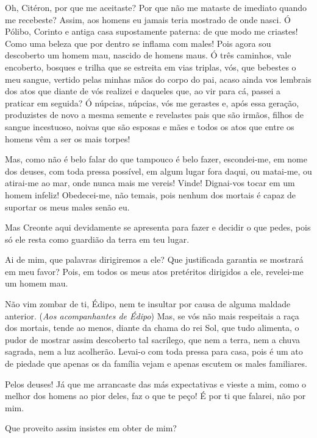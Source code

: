 Oh, Citéron, por que me aceitaste? Por que não me mataste de imediato
quando me recebeste? Assim, aos homens eu jamais teria mostrado de onde
nasci. Ó Pólibo, Corinto e antiga casa supostamente paterna: de que modo
me criastes! Como uma beleza que por dentro se inflama com males! Pois
agora sou descoberto um homem mau, nascido de homens maus. Ó três
caminhos, vale encoberto, bosques e trilha que se estreita em
vias triplas, vós, que bebestes o meu sangue, vertido pelas minhas mãos
do corpo do pai, acaso ainda vos lembrais dos atos que diante de vós
realizei e daqueles que, ao vir para cá, passei a praticar em seguida? Ó
núpcias, núpcias, vós me gerastes e, após essa geração, produzistes de
novo a mesma semente e revelastes pais que são irmãos, filhos de sangue
incestuoso, noivas que são esposas e mães e todos os atos que entre os
homens vêm a ser os mais torpes!

Mas, como não é belo falar do que tampouco é belo fazer, escondei-me, em
 nome dos deuses, com toda pressa possível, em algum lugar fora
daqui, ou matai-me, ou atirai-me ao mar, onde nunca mais me vereis!
Vinde! Dignai-vos tocar em um homem infeliz! Obedecei-me, não temais,
pois nenhum dos mortais é capaz de suportar os meus males senão eu.


   Mas Creonte aqui devidamente se apresenta para fazer e decidir o que
pedes, pois só ele resta como guardião da terra em teu lugar.

   Ai de mim, que palavras dirigiremos a ele? Que justificada
garantia se mostrará em meu favor? Pois, em todos os meus atos
pretéritos dirigidos a ele, revelei-me um homem mau.

   Não vim zombar de ti, Édipo, nem te insultar por causa de alguma maldade
anterior. (\emph{Aos acompanhantes de Édipo}) Mas, se vós não mais
respeitais a raça dos mortais, tende ao menos, diante da chama do rei
Sol, que tudo alimenta, o pudor de mostrar assim descoberto tal
sacrílego, que nem a terra, nem a chuva sagrada, nem a luz acolherão.
Levai-o com toda pressa para casa, pois é um ato de piedade que
apenas os da família vejam e apenas escutem os males familiares.

   Pelos deuses! Já que me arrancaste das más expectativas e vieste a mim,
como o melhor dos homens ao pior deles, faz o que te peço! É por ti que
falarei, não por mim.

   Que proveito assim insistes em obter de mim?


